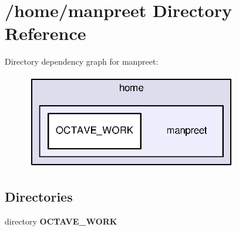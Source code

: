 \section{/home/manpreet Directory Reference}
\label{dir_380b9ad9aa0a96c7169e947ce354edcf}
Directory dependency graph for manpreet\-:\nopagebreak
\begin{figure}[H]
\begin{center}
\leavevmode
\includegraphics[width=263pt]{dir_380b9ad9aa0a96c7169e947ce354edcf_dep}
\end{center}
\end{figure}
\subsection*{Directories}
\begin{DoxyCompactItemize}
\item 
directory {\bf O\-C\-T\-A\-V\-E\-\_\-\-W\-O\-R\-K}
\end{DoxyCompactItemize}
